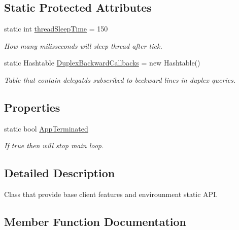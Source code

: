 \subsection*{Static Protected Attributes}
\begin{DoxyCompactItemize}
\item 
static int \mbox{\hyperlink{class_uniform_client_1_1_base_client_a2c4762c1be5eac42b8b5d189530d0952}{thread\+Sleep\+Time}} = 150
\begin{DoxyCompactList}\small\item\em How many milisseconds will sleep thread after tick. \end{DoxyCompactList}\item 
static Hashtable \mbox{\hyperlink{class_uniform_client_1_1_base_client_a52dacc1af85cbab035a159e64e1417a0}{Duplex\+Backward\+Callbacks}} = new Hashtable()
\begin{DoxyCompactList}\small\item\em Table that contain delegatds subscribed to beckward lines in duplex queries. \end{DoxyCompactList}\end{DoxyCompactItemize}
\subsection*{Properties}
\begin{DoxyCompactItemize}
\item 
static bool \mbox{\hyperlink{class_uniform_client_1_1_base_client_a10f1c9dbb8d41719754b39344432497f}{App\+Terminated}}
\begin{DoxyCompactList}\small\item\em If true then will stop main loop. \end{DoxyCompactList}\end{DoxyCompactItemize}


\subsection{Detailed Description}
Class that provide base client features and envirounment static A\+PI. 



\subsection{Member Function Documentation}
\mbox{\label{class_uniform_client_1_1_base_client_a7ec48981cf3e7ec10d2cb7dff81f912a}} 
